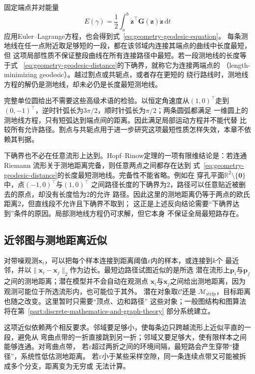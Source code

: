 固定端点并对能量
\[
  E(\gamma)
  =
  \frac12\int_a^b
  \dot{\bm{z}}^{\top}\bm{G}(\bm{z})\dot{\bm{z}}
  \,\mathrm{d}t
\]
应用Euler--Lagrange方程，也会得到式~\eqref{eq:geometry-geodesic-equation}。
每条测地线在任一点附近取足够短的一段，都在该邻域内连接其端点的曲线中长度最短，但
这项局部性质不保证整段曲线在所有连接路径中最短。若一段测地线的长度等于式
~\eqref{eq:geometry-geodesic-distance}的下确界，就称它为连接两端点的
（length-minimizing geodesic）。越过割点或共轭点，或者存在更短的
绕行路线时，测地线方程的解仍是测地线，却未必仍是长度最短测地线。

完整单位圆给出不需要这些高级术语的检验。以恒定角速度从$(1,0)^{\top}$走到
$(0,-1)^{\top}$，逆时针弧长为$3\pi/2$，顺时针弧长为$\pi/2$；两条圆弧都满足
一维圆上的测地线方程，只有短弧达到端点间的距离。因此满足局部运动方程并不能代替
比较所有允许路径。割点与共轭点用于进一步研究这项最短性质怎样失效，本章不依赖其判据。

下确界也不必在任意流形上达到。Hopf--Rinow定理的一项有限维结论是：若连通Riemann
流形关于测地距离完备，则任意两点之间都存在达到
式~\eqref{eq:geometry-geodesic-distance}的长度最短测地线。完备性不能省略。例如在
穿孔平面$\mathbb{R}^2\setminus\{\bm{0}\}$中，点$(-1,0)^{\top}$与$(1,0)^{\top}$
之间路径长度的下确界为$2$，路径可以任意贴近被删去的原点，却没有长度恰为$2$的允许
路径。因此这里的测地距离仍等于两点的欧氏距离$2$，但直线段不允许且下确界不取到；
这正是上述反向结论需要“下确界达到”条件的原因。局部测地线方程仍可求解，但它本身
不保证全局最短路存在。

\subsection{近邻图与测地距离近似}

对带噪观测$\bm{x}_i$，可以把每个样本连接到距离阈值$\varepsilon$内的样本，或连接到$k$个
最近邻，并以$\lVert\bm{x}_i-\bm{x}_j\rVert_2$作为边长。最短边路径试图近似的是所选
潜在流形上$\bm{p}_i$与$\bm{p}_j$之间的测地距离；潜在模型并不会自动在观测点
$\bm{x}_i$与$\bm{x}_j$之间给出测地距离，因为观测可能位于所选流形内，也可能位于其外。
潜在对象取$\mathcal{C}$还是
$\mathcal{M}_{\mathrm{strip}}$，目标距离也随之改变。这里暂时只需要“顶点、边和路径”
这些对象；一般图结构和图算法将在第~\ref{part:discrete-mathematics-and-graph-theory}
部分系统建立。

这项近似依赖两个相反要求。邻域要足够小，使每条边只跨越流形上近似平直的一段，避免从
弯曲点带的一折直接跳到另一折；邻域又要足够大，使有限样本之间能够连通。对弯曲点带，
若$\varepsilon$超过两折之间的环境间隔，最短路会产生穿带“捷径”，系统性低估测地距离。
若$\varepsilon$小于某些采样空隙，同一条连续点带又可能被拆成多个分支，距离变为无穷或
无法计算。

